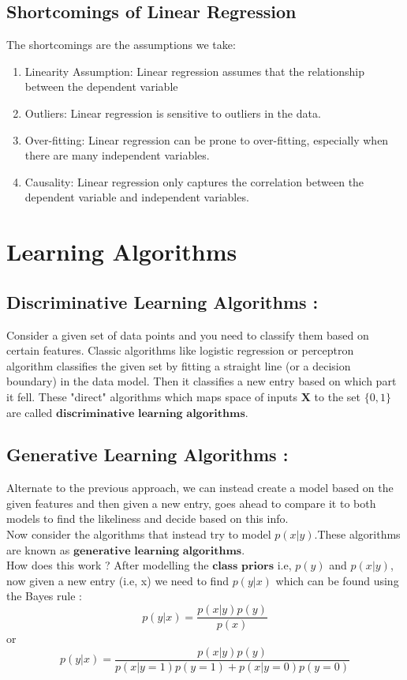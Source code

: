 \documentclass[a4paper,12pt,reqno]{amsart}
\begin{document}
\subsection{Shortcomings of Linear Regression}
The shortcomings are the assumptions we take: 
\begin{enumerate}
    \item Linearity Assumption: Linear regression assumes that the relationship between the dependent variable
    \item Outliers: Linear regression is sensitive to outliers in the data.
    \item Over-fitting: Linear regression can be prone to over-fitting, especially when there are many independent variables. 
    \item Causality: Linear regression only captures the correlation between the dependent variable and independent variables.
\end{enumerate}
\section{Learning Algorithms}

\subsection{Discriminative Learning Algorithms : }
Consider a given set of data points and you need to classify them based on certain features. Classic algorithms like logistic regression or perceptron algorithm classifies the given set by fitting a straight line (or a decision boundary) in the data model. Then it classifies a new entry based on which part it fell.
These "direct" algorithms which maps space of inputs $\textbf{X}$ to the set $\{0,1\}$ are called $\textbf{discriminative learning algorithms}$.

\subsection{Generative Learning Algorithms : }
Alternate to the previous approach, we can instead create a model based on the given features and then given a new entry, goes ahead to compare it to both models to find the likeliness and decide based on this info.\\
Now consider the algorithms that instead try to model $p(x|y)$.These algorithms are known as $\textbf{generative learning algorithms}$.\\
How does this work ? 
After modelling the $\textbf{class priors}$ i.e, $p(y)$ and $p(x|y)$, now given a new entry (i.e, x) we need to find $p(y|x)$ which can be found using the Bayes rule :
$$p(y|x) = \frac{p(x|y)p(y)}{p(x)}$$ or
\begin{equation} \label{eq6}
p(y|x) = \frac{p(x|y)p(y)}{p(x|y = 1)p(y = 1) + p(x|y = 0)p(y = 0)}
\end{equation}
\end{document}
